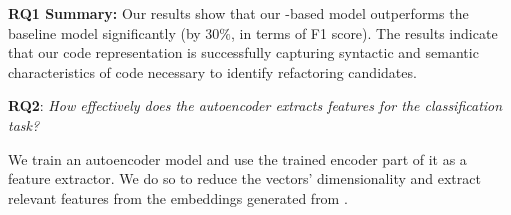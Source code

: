 \begin{boxH}
\textbf{RQ1 Summary:} 
Our results show that our \rf{}-based model outperforms the baseline model significantly (by $30\%$, in terms of F1 score).
The results indicate that our  code representation is successfully capturing syntactic and semantic characteristics of code necessary to identify \exm{} refactoring candidates.
\end{boxH}

\noindent
\textbf{RQ2}: \textit{How effectively does the autoencoder extracts features for the classification task?}

We train an autoencoder model and use the trained encoder part of it as a feature extractor.
We do so to reduce the vectors' dimensionality and extract relevant features from the embeddings generated from \GCB{}. 

